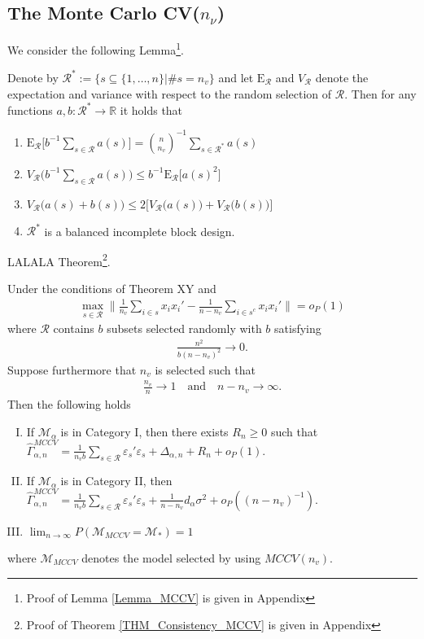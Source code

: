 \documentclass[Research_Module_ES.tex]{subfiles}
\begin{document}
\subsection{The Monte Carlo CV($n_\nu$)}
We consider the following Lemma\footnote{Proof of Lemma \ref{Lemma_MCCV} is given in Appendix }.
\begin{lemma}
	\label{Lemma_MCCV}
Denote by $\mathcal{R}^\ast:= \{s\subseteq\{1,\dots,n\}|\# s=n_v\}$ and let $\mathrm{E}_\mathcal{R}$ and $V_\mathcal{R}$ denote the expectation and variance with respect to the random selection of $\mathcal{R}$. Then for any functions $a,b:\mathcal{R}^\ast\to \mathbb{R}$ it holds that
\begin{enumerate}
\item $\mathrm{E}_\mathcal{R} \bigl[ b^{-1}\sum_{s\in \mathcal{R}}a(s)\bigr] = \binom{n}{n_v}^{-1}\sum_{s\in\mathcal{R}^\ast}a(s)$
\item $V_\mathcal{R} \bigl( b^{-1}\sum_{s\in \mathcal{R}}a(s)\bigr) \le b^{-1} \mathrm{E}_\mathcal{R} \bigl[a(s)^2\bigr]$
\item $V_\mathcal{R}\bigl(a(s)+b(s)\bigr) \le 2\bigl[V_\mathcal{R}\bigl(a(s)\bigr)+V_\mathcal{R}\bigl(b(s)\bigr)\bigr]$
\item $\mathcal{R}^\ast$ is a balanced incomplete block design.
\end{enumerate}
\end{lemma}

LALALA Theorem\footnote{Proof of Theorem \ref{THM_Consistency_MCCV} is given in Appendix }.


\begin{thm}
\label{THM_Consistency_MCCV}
Under the conditions of Theorem XY and
\begin{align*}
\max_{s\in \mathcal{R}}\biggl\lVert \frac{1}{n_v}\sum_{i\in s}x_ix_i' - \frac{1}{n-n_v}\sum_{i\in s^c}x_ix_i'\biggr\rVert =o_P(1)
\end{align*}
where $\mathcal{R}$ contains $b$ subsets selected randomly with $b$ satisfying
\begin{align*}
\frac{n^2}{b(n-n_v)^2}\to 0.
\end{align*}
Suppose furthermore that $n_v$ is selected such that
\begin{align*}
\frac{n_v}{n}\to 1 \quad \textrm{and} \quad n-n_v \to \infty.
\end{align*}
Then the following holds
\begin{enumerate}[(I)]
\item If $\mathcal{M}_\alpha$ is in Category I, then there exists $R_n \ge 0$ such that $\hat{\Gamma}_{\alpha,n}^{MCCV} = \frac{1}{n_vb}\sum_{s\in \mathcal{R}}\varepsilon_s'\varepsilon_s + \Delta_{\alpha,n} + R_n + o_P(1)$.
\item If $\mathcal{M}_\alpha$ is in Category II, then $\hat{\Gamma}_{\alpha,n}^{MCCV} = \frac{1}{n_vb}\sum_{s\in \mathcal{R}}\varepsilon_s'\varepsilon_s + \frac{1}{n-n_v}d_\alpha\sigma^2  + o_P((n-n_v)^{-1})$.
\item $\lim_{n\to\infty}P(\mathcal{M}_{MCCV}=\mathcal{M}_\ast) = 1$
\end{enumerate}
where $\mathcal{M}_{MCCV}$ denotes the model selected by using $MCCV(n_v)$.
\end{thm}
\end{document}
